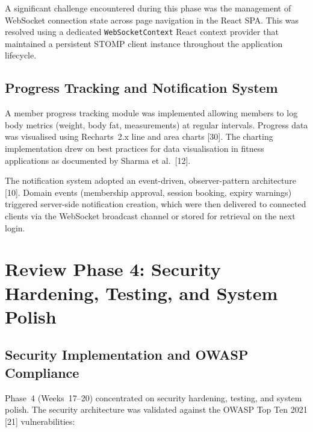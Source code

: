 \documentclass[
  12pt,
  a4paperpaper,
]{report}
\begin{document}
A significant challenge encountered during this phase was the
management of WebSocket connection state across page navigation in
the React SPA. This was resolved using a dedicated
\texttt{WebSocketContext} React context provider that maintained a
persistent STOMP client instance throughout the application
lifecycle.

\subsection{Progress Tracking and Notification
System}\label{progress-and-notifications}

A member progress tracking module was implemented allowing members to
log body metrics (weight, body fat, measurements) at regular
intervals. Progress data was visualised using Recharts~2.x line and
area charts {[}30{]}. The charting implementation drew on
best practices for data visualisation in fitness applications as
documented by Sharma et al.~{[}12{]}.

The notification system adopted an event-driven, observer-pattern
architecture {[}10{]}. Domain events (membership approval,
session booking, expiry warnings) triggered server-side notification
creation, which were then delivered to connected clients via the
WebSocket broadcast channel or stored for retrieval on the next
login.


\section{Review Phase 4: Security Hardening, Testing, and System
Polish}\label{review-phase-4}

\subsection{Security Implementation and OWASP
Compliance}\label{security-owasp}

Phase~4 (Weeks~17--20) concentrated on security hardening, testing,
and system polish. The security architecture was validated against
the OWASP Top Ten 2021 {[}21{]} vulnerabilities:
\end{document}

